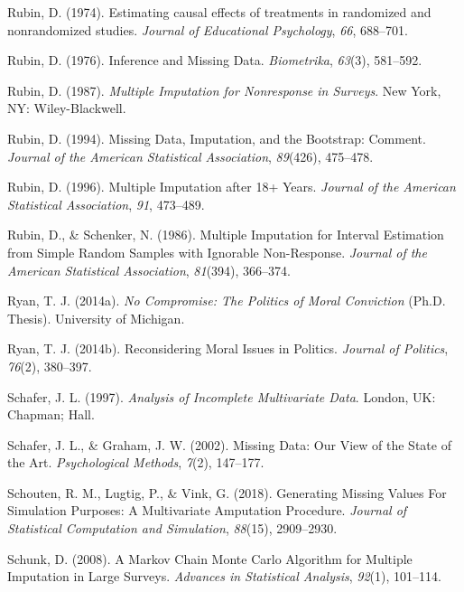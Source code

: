 \documentclass[12pt,econ]{sources/authesis}
\begin{document}
\leavevmode\hypertarget{ref-rubin_1974_estimating}{}%
Rubin, D. (1974). Estimating causal effects of treatments in randomized and nonrandomized studies. \emph{Journal of Educational Psychology}, \emph{66}, 688--701.

\leavevmode\hypertarget{ref-rubin_1976_inference}{}%
Rubin, D. (1976). Inference and Missing Data. \emph{Biometrika}, \emph{63}(3), 581--592.

\leavevmode\hypertarget{ref-rubin_1987_multiple}{}%
Rubin, D. (1987). \emph{Multiple Imputation for Nonresponse in Surveys}. New York, NY: Wiley-Blackwell.

\leavevmode\hypertarget{ref-rubin_1994_missing}{}%
Rubin, D. (1994). Missing Data, Imputation, and the Bootstrap: Comment. \emph{Journal of the American Statistical Association}, \emph{89}(426), 475--478.

\leavevmode\hypertarget{ref-rubin_1996_multiple}{}%
Rubin, D. (1996). Multiple Imputation after 18+ Years. \emph{Journal of the American Statistical Association}, \emph{91}, 473--489.

\leavevmode\hypertarget{ref-rubin_1986_multiple}{}%
Rubin, D., \& Schenker, N. (1986). Multiple Imputation for Interval Estimation from Simple Random Samples with Ignorable Non-Response. \emph{Journal of the American Statistical Association}, \emph{81}(394), 366--374.

\leavevmode\hypertarget{ref-ryan_no_2014}{}%
Ryan, T. J. (2014a). \emph{No Compromise: The Politics of Moral Conviction} (Ph.D. Thesis). University of Michigan.

\leavevmode\hypertarget{ref-ryan_reconsidering_2014}{}%
Ryan, T. J. (2014b). Reconsidering Moral Issues in Politics. \emph{Journal of Politics}, \emph{76}(2), 380--397.

\leavevmode\hypertarget{ref-schafer_1997_analysis}{}%
Schafer, J. L. (1997). \emph{Analysis of Incomplete Multivariate Data}. London, UK: Chapman; Hall.

\leavevmode\hypertarget{ref-schafer_2002_missing}{}%
Schafer, J. L., \& Graham, J. W. (2002). Missing Data: Our View of the State of the Art. \emph{Psychological Methods}, \emph{7}(2), 147--177.

\leavevmode\hypertarget{ref-schouten_2018_generating}{}%
Schouten, R. M., Lugtig, P., \& Vink, G. (2018). Generating Missing Values For Simulation Purposes: A Multivariate Amputation Procedure. \emph{Journal of Statistical Computation and Simulation}, \emph{88}(15), 2909--2930.

\leavevmode\hypertarget{ref-schunk_2008_markov}{}%
Schunk, D. (2008). A Markov Chain Monte Carlo Algorithm for Multiple Imputation in Large Surveys. \emph{Advances in Statistical Analysis}, \emph{92}(1), 101--114.
\end{document}
